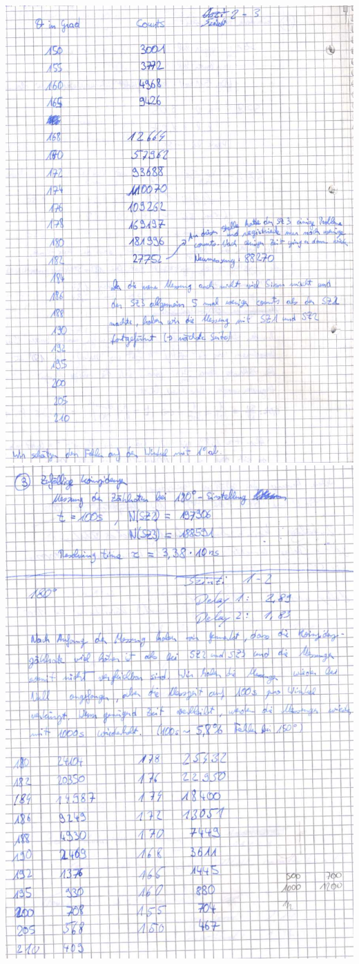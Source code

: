 \clearpage
\includegraphics[scale=0.55]{Messprotokoll/0006.jpeg}
\clearpage
\includegraphics[scale=0.55]{Messprotokoll/0007.jpeg}
